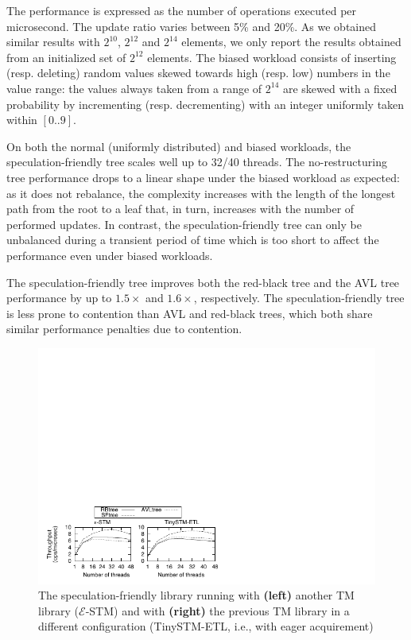 The performance is expressed as the number of operations executed per microsecond. The update ratio varies between 5\% and 20\%. As we obtained similar results with $2^{10}$, $2^{12}$ and $2^{14}$ elements, we only report the results obtained from an initialized set of $2^{12}$ elements.
The biased workload consists of inserting (resp. deleting) random values skewed towards high (resp. low) numbers in the value range: the values always taken from a range of $2^{14}$ are skewed with a fixed probability by incrementing (resp. decrementing) with an integer uniformly taken within $[0..9]$.

On both the normal (uniformly distributed) and biased workloads, the speculation-friendly tree scales 
well up to 32/40 threads. The no-restructuring tree performance drops to a linear shape 
under the biased workload as expected: as it does not rebalance, the complexity increases with the length of the longest path from the root to a leaf that, in turn, increases with the 
number of performed updates.
In contrast, the speculation-friendly tree can only be unbalanced during a transient period of time which is too short to affect the performance 
even under biased workloads. 

The speculation-friendly tree improves both the red-black tree and the AVL tree performance by up to $1.5\times$ and $1.6\times$, respectively. 
The speculation-friendly tree is less prone to contention than AVL and red-black trees, which both share similar performance penalties due to contention.


\begin{figure}
	\begin{center}
	\includegraphics[scale=1.6,clip=true,viewport=0 0 200 83]{Tree/fig/microbench/microbench_avg_4096_u10_estm}
	\caption{The speculation-friendly library running with {\bf (left)} another TM library (${\mathcal E}$-STM) and with {\bf (right)} the previous TM library in a different configuration (TinySTM-ETL, i.e., with eager acquirement)\label{fig:estm}} 
	\end{center}
\end{figure}

